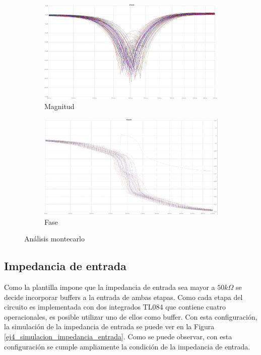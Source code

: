 \begin{figure}[ht!]
    \centering
    \begin{subfigure}{.8\textwidth}
        \centering
        \includegraphics[width=.9\linewidth]{../Ex4/Resources/ej4_montecarlo_mag.png}  
        \caption{Magnitud}
    
    \end{subfigure}
    \begin{subfigure}{.8\textwidth}
        \centering
        \includegraphics[width=.9\linewidth]{../Ex4/Resources/ej4_montecarlo_fase.png}  
        \caption{Fase}

    \end{subfigure}
    \caption{Análisis montecarlo}
    \label{ej4_montecarlo}
    \end{figure}
    


\subsection{Impedancia de entrada}

Como la plantilla impone  que la impedancia de entrada sea mayor a $50k \Omega$ se decide incorporar buffers a la entrada de ambas etapas. Como cada etapa del circuito es implementada con dos integrados TL084 que contiene cuatro operacionales, es posible utilizar uno de ellos como buffer. Con esta configuración, la simulación de la impedancia de entrada se puede ver en la Figura \ref{ej4_simulacion_impedancia_entrada}. Como se puede observar, con esta configuración se cumple ampliamente la condición de la impedancia de entrada. 

